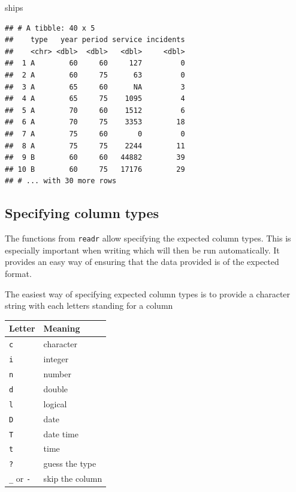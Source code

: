 \documentclass[
]{book}
\newenvironment{Shaded}{\begin{snugshade}}{\end{snugshade}}
\newcommand{\NormalTok}[1]{#1}
\begin{document}
\begin{Shaded}
\begin{Highlighting}[]
\NormalTok{ships}
\end{Highlighting}
\end{Shaded}

\begin{verbatim}
## # A tibble: 40 x 5
##    type   year period service incidents
##    <chr> <dbl>  <dbl>   <dbl>     <dbl>
##  1 A        60     60     127         0
##  2 A        60     75      63         0
##  3 A        65     60      NA         3
##  4 A        65     75    1095         4
##  5 A        70     60    1512         6
##  6 A        70     75    3353        18
##  7 A        75     60       0         0
##  8 A        75     75    2244        11
##  9 B        60     60   44882        39
## 10 B        60     75   17176        29
## # ... with 30 more rows
\end{verbatim}

\hypertarget{specifying-column-types}{%
\subsection{Specifying column types}\label{specifying-column-types}}

The functions from \texttt{readr} allow specifying the expected column types. This is especially important when writing which will then be run automatically. It provides an easy way of ensuring that the data provided is of the expected format.

The easiest way of specifying expected column types is to provide a character string with each letters standing for a column

\begin{longtable}[]{@{}ll@{}}
\toprule()
Letter & Meaning \\
\midrule()
\endhead
\texttt{c} & character \\
\texttt{i} & integer \\
\texttt{n} & number \\
\texttt{d} & double \\
\texttt{l} & logical \\
\texttt{D} & date \\
\texttt{T} & date time \\
\texttt{t} & time \\
\texttt{?} & guess the type \\
\texttt{\_} or \texttt{-} & skip the column \\
\bottomrule()
\end{longtable}
\end{document}
